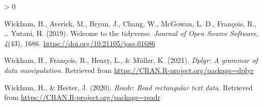 \documentclass[
  english,
  man]{apa6}
\newlength{\cslhangindent}
\newenvironment{CSLReferences}[2] %
 {%
  \setlength{\parindent}{0pt}
  \ifodd #1 \everypar{\setlength{\hangindent}{\cslhangindent}}\ignorespaces\fi
  \ifnum #2 > 0
  \setlength{\parskip}{#2\baselineskip}
  \fi
 }%
 {}
\begin{document}
\begin{CSLReferences}{1}{0}
\leavevmode\hypertarget{ref-R-tidyverse}{}%
Wickham, H., Averick, M., Bryan, J., Chang, W., McGowan, L. D., François, R., \ldots{} Yutani, H. (2019). Welcome to the {tidyverse}. \emph{Journal of Open Source Software}, \emph{4}(43), 1686. \url{https://doi.org/10.21105/joss.01686}

\leavevmode\hypertarget{ref-R-dplyr}{}%
Wickham, H., François, R., Henry, L., \& Müller, K. (2021). \emph{Dplyr: A grammar of data manipulation}. Retrieved from \url{https://CRAN.R-project.org/package=dplyr}

\leavevmode\hypertarget{ref-R-readr}{}%
Wickham, H., \& Hester, J. (2020). \emph{Readr: Read rectangular text data}. Retrieved from \url{https://CRAN.R-project.org/package=readr}

\end{CSLReferences}

\endgroup
\end{document}
